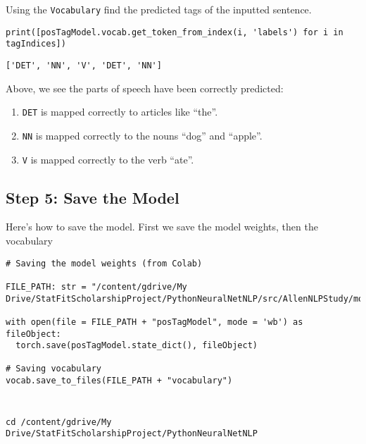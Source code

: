 \documentclass[
]{article}
\providecommand{\tightlist}{%
  \setlength{\itemsep}{0pt}\setlength{\parskip}{0pt}}
\begin{document}
Using the \texttt{Vocabulary} find the predicted tags of the inputted
sentence.

\begin{verbatim}
print([posTagModel.vocab.get_token_from_index(i, 'labels') for i in tagIndices])
\end{verbatim}

\begin{verbatim}
['DET', 'NN', 'V', 'DET', 'NN']
\end{verbatim}

Above, we see the parts of speech have been correctly predicted:

\begin{enumerate}
\def\labelenumi{\arabic{enumi}.}
\tightlist
\item
  \texttt{DET} is mapped correctly to articles like ``the''.
\item
  \texttt{NN} is mapped correctly to the nouns ``dog'' and ``apple''.
\item
  \texttt{V} is mapped correctly to the verb ``ate''.
\end{enumerate}

\hypertarget{step-5-save-the-model}{%
\subsection{Step 5: Save the Model}\label{step-5-save-the-model}}

Here's how to save the model. First we save the model weights, then the
vocabulary

\begin{verbatim}
# Saving the model weights (from Colab)

FILE_PATH: str = "/content/gdrive/My Drive/StatFitScholarshipProject/PythonNeuralNetNLP/src/AllenNLPStudy/model_LSTMPOSTagger/"

with open(file = FILE_PATH + "posTagModel", mode = 'wb') as fileObject:
  torch.save(posTagModel.state_dict(), fileObject)

# Saving vocabulary 
vocab.save_to_files(FILE_PATH + "vocabulary")
\end{verbatim}

\begin{verbatim}
\end{verbatim}

\begin{verbatim}
\end{verbatim}

\begin{verbatim}
cd /content/gdrive/My Drive/StatFitScholarshipProject/PythonNeuralNetNLP
\end{verbatim}
\end{document}
